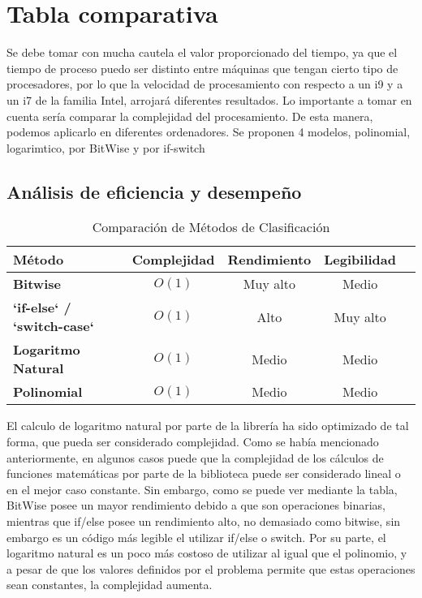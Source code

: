 \documentclass{article}
\begin{document}
\section{Tabla comparativa}
Se debe tomar con mucha cautela el valor proporcionado del tiempo, ya que el tiempo de proceso puedo ser distinto entre máquinas que tengan cierto tipo de procesadores, por lo que la velocidad de procesamiento con respecto a un i9 y a un i7 de la familia Intel, arrojará diferentes resultados.
Lo importante a tomar en cuenta sería comparar la complejidad del procesamiento. De esta manera, podemos aplicarlo en diferentes ordenadores.
Se proponen 4 modelos, polinomial, logarimtico, por BitWise y por if-switch
\subsection{Análisis de eficiencia y desempeño}

\begin{table}[h!]
    \centering
    \begin{tabular}{@{}lcccc@{}}
        \toprule
        \textbf{Método} & \textbf{Complejidad} & \textbf{Rendimiento} & \textbf{Legibilidad}  \\ \midrule
        \textbf{Bitwise} & \( O(1) \) & Muy alto & Medio  \\
        \textbf{`if-else` / `switch-case`} & \( O(1) \) & Alto & Muy alto  \\
        \textbf{Logaritmo Natural} & \( O(1) \) & Medio & Medio \\
        \textbf{Polinomial} & \( O(1) \) & Medio & Medio  \\ \bottomrule
    \end{tabular}
    \caption{Comparación de Métodos de Clasificación}
\end{table}
El calculo de logaritmo natural por parte de la librería ha sido optimizado de tal forma, que pueda ser considerado complejidad. Como se había mencionado anteriormente, en algunos casos puede que la complejidad de los cálculos de funciones matemáticas por parte de la biblioteca puede ser considerado lineal o en el mejor caso constante. 
Sin embargo, como se puede ver mediante la tabla, BitWise posee un mayor rendimiento debido a que son operaciones binarias, mientras que if/else posee un rendimiento alto, no demasiado como bitwise, sin embargo es un código más legible el utilizar if/else o switch.
Por su parte, el logaritmo natural es un poco más costoso de utilizar al igual que el polinomio, y a pesar de que los valores definidos por el problema permite que estas operaciones sean constantes, la complejidad aumenta. 
\end{document}
